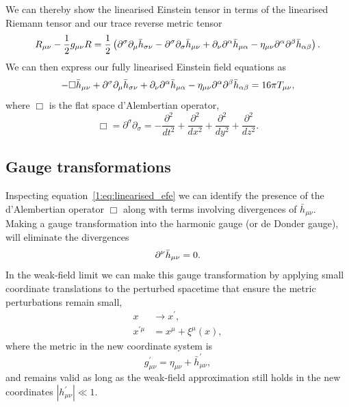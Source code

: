 We can thereby show the linearised Einstein tensor in terms of the linearised Riemann tensor and our trace reverse metric tensor
%
\begin{equation}
    R_{\mu\nu} - \frac{1}{2}g_{\mu\nu}R = \frac{1}{2}\left(\partial^{\sigma}\partial_{\mu}\Bar{h}_{\sigma\nu} - \partial^{\sigma}\partial_{\sigma}\Bar{h}_{\mu\nu} + \partial_{\nu}\partial^{\alpha}\Bar{h}_{\mu\alpha} - \eta_{\mu\nu}\partial^{\alpha}\partial^{\beta}\Bar{h}_{\alpha\beta}\right).
\end{equation}
%
We can then express our fully linearised Einstein field equations as
%
\begin{equation}
    - \Box\Bar{h}_{\mu\nu} + \partial^{\sigma}\partial_{\mu}\Bar{h}_{\sigma\nu}  + \partial_{\nu}\partial^{\alpha}\Bar{h}_{\mu\alpha} - \eta_{\mu\nu}\partial^{\alpha}\partial^{\beta}\Bar{h}_{\alpha\beta} = 16\pi T_{\mu\nu},
    \label{1:eq:linearised_efe}
\end{equation}
%
where $\Box$ is the flat space d'Alembertian operator,
%
\begin{equation}
    \Box = \partial^{\sigma}\partial_{\sigma} = -\frac{\partial^{2}}{dt^{2}} + \frac{\partial^{2}}{dx^{2}} + \frac{\partial^{2}}{dy^{2}} + \frac{\partial^{2}}{dz^{2}}.
\end{equation}
%

\subsection{\label{1:sec:gauge-transformations}Gauge transformations}

Inspecting equation~\ref{1:eq:linearised_efe} we can identify the presence of the d'Alembertian operator $\Box$ along with terms involving divergences of $\bar{h}_{\mu\nu}$. Making a gauge transformation into the 
harmonic gauge (or de Donder gauge), will eliminate the divergences
%
\begin{equation}
    \partial^{\nu} \Bar{h}_{\mu\nu} = 0.
    \label{1:eq:divergence_gone}
\end{equation}
%
In the weak-field limit we can make this gauge transformation by applying small coordinate translations to the perturbed spacetime that ensure the metric perturbations remain small,
%
\begin{align}
    x &\rightarrow x^{\prime}, \\
    x^{\prime\mu} &= x^{\mu} + \xi^{\mu}(x),
    \label{1:eq:gauge_transform}
\end{align}
%
where the metric in the new coordinate system is
%
\begin{equation}
    g^{\prime}_{\mu\nu} = \eta_{\mu\nu} + \bar{h}^{\prime}_{\mu\nu},
    \label{1:eq:gauge_metric}
\end{equation}
%
and remains valid as long as the weak-field approximation still holds in the new coordinates $|h^{\prime}_{\mu\nu}| \ll 1$.

